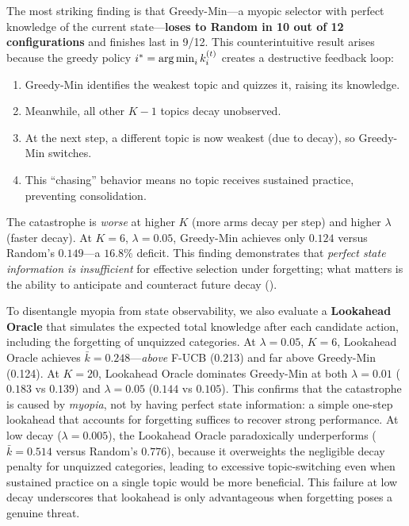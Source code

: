 The most striking finding is that Greedy-Min---a myopic selector with perfect knowledge of the current state---\textbf{loses to Random in 10 out of 12 configurations} and finishes last in 9/12.
This counterintuitive result arises because the greedy policy $i^* = \operatorname*{arg\,min}_i k_i^{(t)}$ creates a destructive feedback loop:

\begin{enumerate}[leftmargin=*,itemsep=1pt]
    \item Greedy-Min identifies the weakest topic and quizzes it, raising its knowledge.
    \item Meanwhile, all other $K{-}1$ topics decay unobserved.
    \item At the next step, a different topic is now weakest (due to decay), so Greedy-Min switches.
    \item This ``chasing'' behavior means no topic receives sustained practice, preventing consolidation.
\end{enumerate}

The catastrophe is \emph{worse} at higher $K$ (more arms decay per step) and higher $\lambda$ (faster decay).
At $K{=}6$, $\lambda{=}0.05$, Greedy-Min achieves only $0.124$ versus Random's $0.149$---a $16.8\%$ deficit.
This finding demonstrates that \emph{perfect state information is insufficient} for effective selection under forgetting; what matters is the ability to anticipate and counteract future decay ().

To disentangle myopia from state observability, we also evaluate a \textbf{Lookahead Oracle} that simulates the expected total knowledge after each candidate action, including the forgetting of unquizzed categories. At $\lambda{=}0.05$, $K{=}6$, Lookahead Oracle achieves $\bar{k} = 0.248$---\emph{above} F-UCB (0.213) and far above Greedy-Min (0.124). At $K{=}20$, Lookahead Oracle dominates Greedy-Min at both $\lambda{=}0.01$ ($0.183$ vs $0.139$) and $\lambda{=}0.05$ ($0.144$ vs $0.105$). This confirms that the catastrophe is caused by \emph{myopia}, not by having perfect state information: a simple one-step lookahead that accounts for forgetting suffices to recover strong performance.
At low decay ($\lambda{=}0.005$), the Lookahead Oracle paradoxically underperforms ($\bar{k}{=}0.514$ versus Random's $0.776$), because it overweights the negligible decay penalty for unquizzed categories, leading to excessive topic-switching even when sustained practice on a single topic would be more beneficial. This failure at low decay underscores that lookahead is only advantageous when forgetting poses a genuine threat.

